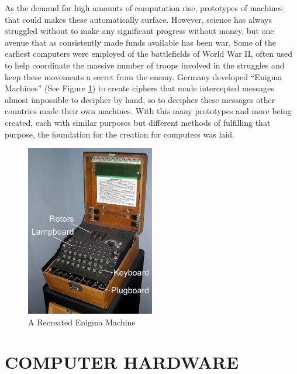 \documentclass[letterpaper, 10 pt, conference]{IEEEconf}
\begin{document}
As the demand for high amounts of computation rise, 
prototypes of machines that could makes these 
automatically surface. However, science has 
always struggled without to make any significant 
progress without money, but one avenue that as 
consistently made funds available has been war. 
Some of the earliest computers were employed of the 
battlefields of World War II, often used to help coordinate 
the massive number of troops involved in the struggles and 
keep these movements a secret from the enemy. Germany developed 
“Enigma Machines” (See Figure \ref{fig:EM}) to create ciphers that made 
intercepted messages almost impossible to decipher by hand, so to decipher 
these messages other countries made their own machines. With 
this many prototypes and more being created, each with 
similar purposes but different methods of fulfilling that purpose, 
the foundation for the creation for computers was laid.  
\begin{figure}[h!]
\centering
\includegraphics[width=0.5\textwidth]{EnigmaMachineLabeled}
\caption{A Recreated Enigma Machine}
\label{fig:EM}
\end{figure}   

\section{COMPUTER HARDWARE}
\end{document}
